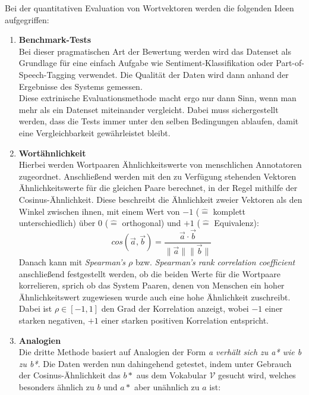   Bei der quantitativen Evaluation von Wortvektoren werden die folgenden Ideen aufgegriffen:\\
  \begin{enumerate}
    \item \textbf{Benchmark-Tests}\\
      Bei dieser pragmatischen Art der Bewertung werden wird das Datenset als Grundlage für
      eine einfach Aufgabe wie Sentiment-Klassifikation oder Part-of-Speech-Tagging verwendet.
      Die Qualität der Daten wird dann anhand der Ergebnisse des Systems gemessen.\\
      Diese extrinische Evaluationsmethode macht ergo nur dann Sinn, wenn man mehr als ein Datenset
      miteinander vergleicht. Dabei muss sichergestellt werden, dass die Tests immer unter den
      selben Bedingungen ablaufen, damit eine Vergleichbarkeit gewährleistet bleibt.\\
    \item \textbf{Wortähnlichkeit}\\
      Hierbei werden Wortpaaren Ähnlichkeitswerte von menschlichen Annotatoren zugeordnet. Anschließend
      werden mit den zu Verfügung stehenden Vektoren Ähnlichkeitswerte für die gleichen Paare berechnet,
      in der Regel mithilfe der Cosinus-Ähnlichkeit. Diese beschreibt die Ähnlichkeit zweier Vektoren
      als den Winkel zwischen ihnen, mit einem Wert von $-1$ ($\hat{=}$ komplett unterschiedlich) über 0
      ($\hat{=}$ orthogonal) und $+1$ ($\hat{=}$ Equivalenz):
      \begin{equation}\label{form:cossim}
        cos(\vec{a}, \vec{b}) = \frac{\vec{a} \cdot \vec{b}}{\|\vec{a}\| \|\vec{b}\|}
      \end{equation}
      Danach kann mit \emph{Spearman's $\rho$} bzw. \emph{Spearman's rank correlation coefficient}
      anschließend festgestellt werden, ob die beiden Werte für die Wortpaare korrelieren, sprich ob
      das System Paaren, denen von Menschen ein hoher Ähnlichkeitswert zugewiesen wurde auch eine hohe
      Ähnlichkeit zuschreibt. Dabei ist $\rho \in [-1, 1]$ den Grad der Korrelation anzeigt, wobei
      $-1$ einer starken negativen, $+1$ einer starken positiven Korrelation entspricht.
    \item \textbf{Analogien}\\
      Die dritte Methode basiert auf Analogien der Form \emph{a verhält sich zu a* wie b zu b*}.
      Die Daten werden nun dahingehend getestet, indem unter Gebrauch der Cosinus-Ähnlichkeit
      das $b*$ aus dem Vokabular $\mathcal{V}$ gesucht wird, welches besonders ähnlich zu $b$ und $a*$ aber unähnlich zu $a$ ist:

\end{enumerate}
